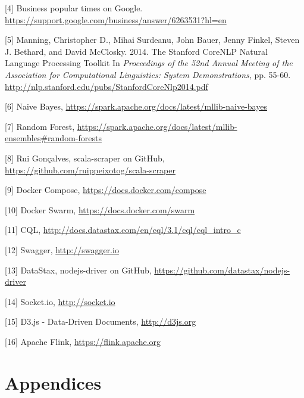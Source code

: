 \documentclass[11pt]{article}
\begin{document}
[4] Business popular times on Google. \url{https://support.google.com/business/answer/6263531?hl=en}
\vspace{1pt}

[5] Manning, Christopher D., Mihai Surdeanu, John Bauer, Jenny Finkel, Steven J. Bethard, and David McClosky. 2014. The Stanford CoreNLP Natural Language Processing Toolkit In \textit{Proceedings of the 52nd Annual Meeting of the Association for Computational Linguistics: System Demonstrations}, pp. 55-60. \url{http://nlp.stanford.edu/pubs/StanfordCoreNlp2014.pdf}
\vspace{1pt}

[6] Naive Bayes, \url{https://spark.apache.org/docs/latest/mllib-naive-bayes}
\vspace{1pt}

[7] Random Forest, \url{https://spark.apache.org/docs/latest/mllib-ensembles#random-forests}
\vspace{1pt}

[8] Rui Gonçalves, scala-scraper on GitHub, \url{https://github.com/ruippeixotog/scala-scraper}
\vspace{1pt}

[9] Docker Compose, \url{https://docs.docker.com/compose}
\vspace{1pt}

[10] Docker Swarm, \url{https://docs.docker.com/swarm}
\vspace{1pt}

[11] CQL, \url{http://docs.datastax.com/en/cql/3.1/cql/cql_intro_c}
\vspace{1pt}

[12] Swagger, \url{http://swagger.io}
\vspace{1pt}

[13] DataStax, nodejs-driver on GitHub, \url{https://github.com/datastax/nodejs-driver}
\vspace{1pt}

[14] Socket.io, \url{http://socket.io}
\vspace{1pt}

[15] D3.js - Data-Driven Documents, \url{http://d3js.org}
\vspace{1pt}

[16] Apache Flink, \url{https://flink.apache.org}

\newpage
{}
\section{Appendices}
\end{document}

